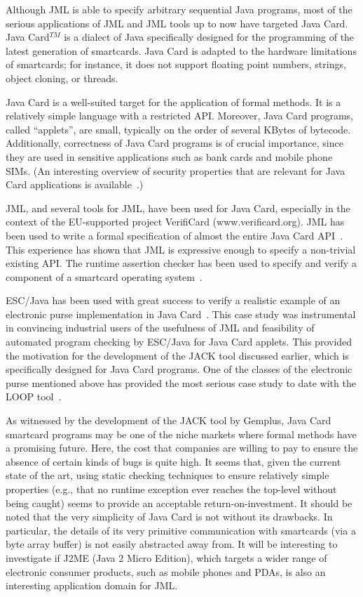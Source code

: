 Although JML is able to specify arbitrary sequential Java programs,
most of the serious applications of JML and JML tools up to now
have targeted Java Card.  Java Card$^{TM}$ is a dialect of Java specifically
designed for the programming of the latest generation of smartcards.
Java Card is adapted to the hardware limitations of smartcards; for
instance, it does not support floating point numbers, strings, object
cloning, or threads.

Java Card is a well-suited target for the application of formal
methods.  It is a relatively simple language with a restricted API\@.
Moreover, Java Card programs, called ``applets'', are small, typically
on the order of several KBytes of bytecode.  Additionally, correctness
of Java Card programs is of crucial importance, since they are used in
sensitive applications such as bank cards and mobile phone SIMs.  (An
interesting overview of security properties that are relevant for Java
Card applications is available~\cite{MarletLM01}.)

JML, and several tools for JML, have been used for Java Card,
especially in the context of the EU-supported project VerifiCard
(www.verificard.org).  JML has been used to write a formal
specification of almost the entire Java Card
API~\cite{PollBergJacobs01}.  This experience has shown that JML is
expressive enough to specify a non-trivial existing API\@.  The
runtime assertion checker has been used to specify and verify a
component of a smartcard operating system~\cite{PollHarteldeJong02}.

ESC/Java has been used with great success to verify a realistic
example of an electronic purse implementation in Java
Card~\cite{CatanoHuisman02}. This case study was instrumental in
convincing industrial users of the usefulness of JML and feasibility
of automated program checking by ESC/Java for Java Card applets.  This
provided the motivation for the development of the JACK tool discussed
earlier, which is specifically designed for Java Card programs.  One
of the classes of the electronic purse mentioned above has provided
the most serious case study to date with the LOOP
tool~\cite{BreunesseBJ02}.

As witnessed by the development of the JACK tool by Gemplus, Java Card
smartcard programs may be one of the niche markets where formal
methods have a promising future. Here, the cost that companies are
willing to pay to ensure the absence of certain kinds of bugs is quite
high.  It seems that, given the current state of the art, using static
checking techniques to ensure relatively simple properties (e.g., that
no runtime exception ever reaches the top-level without being caught)
seems to provide an acceptable return-on-investment.  It should be
noted that the very simplicity of Java Card is not without its
drawbacks.  In particular, the details of its very primitive
communication with smartcards (via a byte array buffer) is not easily
abstracted away from.  It will be interesting to investigate if J2ME (Java 2
Micro Edition), which targets a wider range of electronic consumer
products, such as mobile phones and PDAs, is also an interesting
application domain for JML\@.

